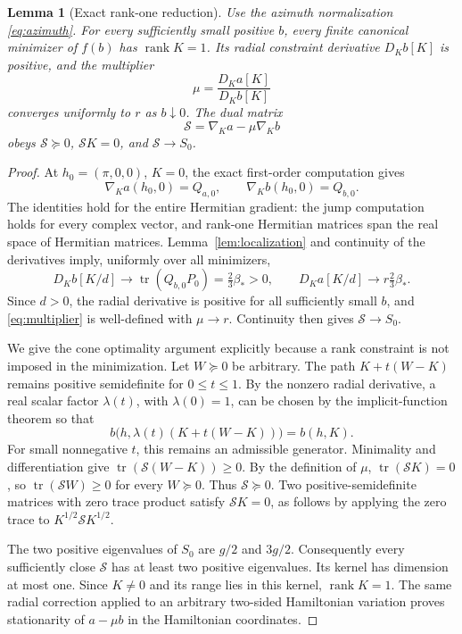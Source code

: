 \documentclass[11pt]{article}
\newtheorem{lemma}[theorem]{Lemma}
\theoremstyle{definition}
\theoremstyle{remark}
\DeclareMathOperator{\tr}{tr}
\DeclareMathOperator{\rank}{rank}
\newcommand{\PSD}{\succeq0}
\begin{document}
\begin{lemma}[Exact rank-one reduction]\label{lem:rank-one}
Use the azimuth normalization \eqref{eq:azimuth}. For every sufficiently small positive \(b\), every finite canonical minimizer of \(f(b)\) has \(\rank K=1\). Its radial constraint derivative \(D_Kb[K]\) is positive, and the multiplier
\begin{equation}\label{eq:multiplier}
 \mu=\frac{D_Ka[K]}{D_Kb[K]}
\end{equation}
converges uniformly to \(r\) as \(b\downarrow0\). The dual matrix
\begin{equation}\label{eq:dual}
 \mathcal S=\nabla_Ka-\mu\nabla_Kb
\end{equation}
obeys \(\mathcal S\PSD\), \(\mathcal SK=0\), and \(\mathcal S\to S_0\).
\end{lemma}
\begin{proof}
At \(h_0=(\pi,0,0)\), \(K=0\), the exact first-order computation gives
\[
 \nabla_Ka(h_0,0)=Q_{a,0},\qquad
 \nabla_Kb(h_0,0)=Q_{b,0}.
\]
The identities hold for the entire Hermitian gradient: the jump computation holds for every complex vector, and rank-one Hermitian matrices span the real space of Hermitian matrices. Lemma~\ref{lem:localization} and continuity of the derivatives imply, uniformly over all minimizers,
\[
 D_Kb[K/d]\longrightarrow\tr(Q_{b,0}P_0)=\tfrac23\beta_*>0,
 \qquad D_Ka[K/d]\longrightarrow r\tfrac23\beta_*.
\]
Since \(d>0\), the radial derivative is positive for all sufficiently small \(b\), and \eqref{eq:multiplier} is well-defined with \(\mu\to r\). Continuity then gives \(\mathcal S\to S_0\).

We give the cone optimality argument explicitly because a rank constraint is not imposed in the minimization. Let \(W\PSD\) be arbitrary. The path \(K+t(W-K)\) remains positive semidefinite for \(0\leq t\leq1\). By the nonzero radial derivative, a real scalar factor \(\lambda(t)\), with \(\lambda(0)=1\), can be chosen by the implicit-function theorem so that
\[
 b\bigl(h,\lambda(t)(K+t(W-K))\bigr)=b(h,K).
\]
For small nonnegative \(t\), this remains an admissible generator. Minimality and differentiation give
\(\tr(\mathcal S(W-K))\geq0\).
By the definition of \(\mu\), \(\tr(\mathcal SK)=0\), so \(\tr(\mathcal SW)\geq0\) for every \(W\PSD\). Thus \(\mathcal S\PSD\). Two positive-semidefinite matrices with zero trace product satisfy \(\mathcal SK=0\), as follows by applying the zero trace to \(K^{1/2}\mathcal SK^{1/2}\).

The two positive eigenvalues of \(S_0\) are \(g/2\) and \(3g/2\). Consequently every sufficiently close \(\mathcal S\) has at least two positive eigenvalues. Its kernel has dimension at most one. Since \(K\ne0\) and its range lies in this kernel, \(\rank K=1\). The same radial correction applied to an arbitrary two-sided Hamiltonian variation proves stationarity of \(a-\mu b\) in the Hamiltonian coordinates.
\end{proof}
\end{document}
